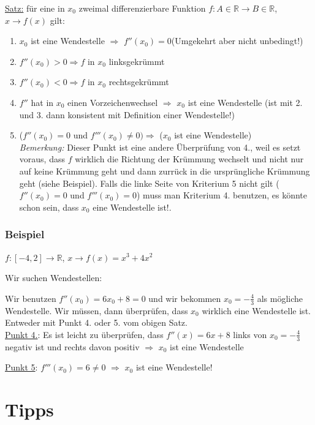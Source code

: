 \documentclass[11pt]{article} %
\begin{document}
\underline{Satz:} für eine in $x_0$ zweimal differenzierbare Funktion $f: A \in \mathbb{R} \rightarrow B \in \mathbb{R}$, $x \rightarrow f(x)$ gilt:
\begin{enumerate}
\item $x_0$ ist eine Wendestelle $\Rightarrow$ $f''(x_0) = 0$\qquad (Umgekehrt aber nicht unbedingt!)
\item $f''(x_0) > 0 \Rightarrow f$ in $x_0$ linksgekrümmt
\item  $f''(x_0) < 0 \Rightarrow f$ in $x_0$ rechtsgekrümmt
\item $f''$ hat in $x_0$ einen Vorzeichenwechsel $\Rightarrow$ $x_0$ ist eine Wendestelle (ist mit 2. und 3. dann konsistent mit Definition einer Wendestelle!)
\item ($f''(x_0)=0$ und $f'''(x_0) \neq 0) \Rightarrow$ ($x_0$ ist eine Wendestelle) \\
\emph{Bemerkung:} Dieser Punkt ist eine andere Überprüfung von 4., weil es setzt voraus, dass $f$ wirklich die Richtung der Krümmung wechselt und nicht nur auf keine Krümmung geht und dann zurrück in die ursprüngliche Krümmung geht (siehe Beispiel). Falls die linke Seite von Kriterium 5 nicht gilt ($f''(x_0)=0$ und $f'''(x_0)=0$) muss man Kriterium 4. benutzen, es könnte schon sein, dass $x_0$ eine Wendestelle ist!.
\end{enumerate}


\subsubsection{Beispiel}

$f: [-4,2] \rightarrow \mathbb{R}$, $x\rightarrow f(x) = x^3+4x^2$
 
Wir suchen Wendestellen:

Wir benutzen $f''(x_0)= 6x_0 + 8 =0$ und wir bekommen $x_0= -\frac{4}{3}$ als mögliche Wendestelle. Wir müssen, dann überprüfen, dass $x_0$ wirklich eine Wendestelle ist. Entweder mit Punkt 4. oder 5. vom obigen Satz. \\

\underline{Punkt 4.}:  Es ist leicht zu überprüfen, dass $f''(x) = 6x+8$ links von $x_0= -\frac{4}{3}$ negativ ist und rechts davon positiv $\Rightarrow$ $x_0$ ist eine Wendestelle

\underline{Punkt 5}: $f'''(x_0) = 6 \neq 0$ $\Rightarrow$ $x_0$ ist eine Wendestelle!

\section{Tipps}
\end{document}
